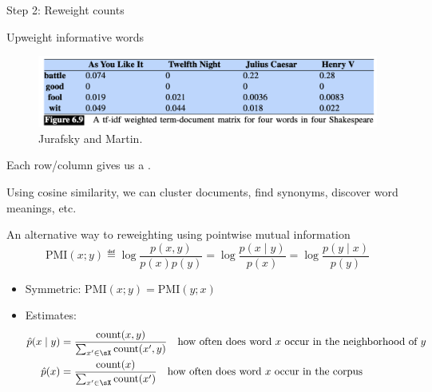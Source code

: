 \documentclass[usenames,dvipsnames,notes,11pt,aspectratio=169]{beamer}
\newcommand{\pdfnote}[1]{}
\begin{document}
\begin{frame}
    {Step 2: Reweight counts}

    Upweight informative words
    \vspace{-1em}
    \begin{figure}
            \includegraphics[width=\textwidth]{figures/term-doc-tfidf}
                    \caption{Jurafsky and Martin.}
    \end{figure}

    Each row/column gives us a .
    \pdfnote{What can you do with it?}
   
    \pause
    Using cosine similarity, we can cluster documents, find synonyms, discover word meanings, etc.
\end{frame}

\begin{frame}
    {An alternative way to reweighting using pointwise mutual information}
    $$
    \text{PMI}(x;y) \eqdef \log \frac{p(x,y)}{p(x)p(y)}
    = \log\frac{p(x\mid y)}{p(x)}
    = \log\frac{p(y\mid x)}{p(y)}
    $$
    \pause
    \vspace{-1em}
    \begin{itemize}
        \itemsep1em
        \item Symmetric: $\text{PMI}(x;y)=\text{PMI}(y;x)$
        \item Estimates:
            \begin{align*}
                \hat{p}(x\mid y) &= \frac{\text{count}(x,y)}{\sum_{x'\in\sX}\text{count}(x', y)} \quad \text{how often does word $x$ occur in the neighborhood of $y$}\\
                \hat{p}(x) &= \frac{\text{count}(x)}{\sum_{x'\in\sX}\text{count}(x')}
                \quad \text{how often does word $x$ occur in the corpus}
            \end{align*}
    \end{itemize}
\end{frame}
\end{document}
